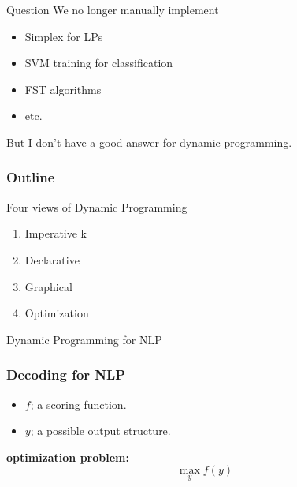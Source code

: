 \documentclass{beamer}
\newcommand{\air}{\vspace{0.5cm}}
\begin{document}
\bgroup
{}



\begin{frame}{Question}
  We no longer manually implement 
  \begin{itemize}    
    \air 
  
    \item Simplex for LPs
      \air

    \item SVM training for classification
      \air
      
    \item FST algorithms
      \air 

    \item etc. 
  \end{itemize}
  \pause 
  \air
  But I don't have a good answer for dynamic programming.
\end{frame}

\begin{frame}
  \frametitle{Outline}
  Four views of Dynamic Programming
  \begin{enumerate}
  \item Imperative
    \air
k
  \item Declarative
    \air
  \item Graphical
    \air 
  \item Optimization
  \end{enumerate}
\end{frame}

\begin{frame}
  \begin{center}
    \Large{Dynamic Programming for NLP}
  \end{center}
\end{frame}

\begin{frame}[c]
  \frametitle{Decoding for NLP}

  \begin{itemize}
  \item $f$; a scoring function.
  \item $y$; a possible output structure.  
  \end{itemize}

  \textbf{optimization problem:} 
  \[ \max_{y} f(y) \]

\end{frame}
\end{document}

